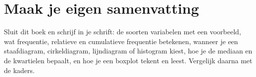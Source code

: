 
\ifzelfstudie
\section*{Maak je eigen samenvatting}
Sluit dit boek en schrijf in je schrift: de soorten variabelen met een voorbeeld, wat frequentie, relatieve en cumulatieve frequentie betekenen, wanneer je een staafdiagram, cirkeldiagram, lijndiagram of histogram kiest, hoe je de mediaan en de kwartielen bepaalt, en hoe je een boxplot tekent en leest. Vergelijk daarna met de kaders.
\fi
